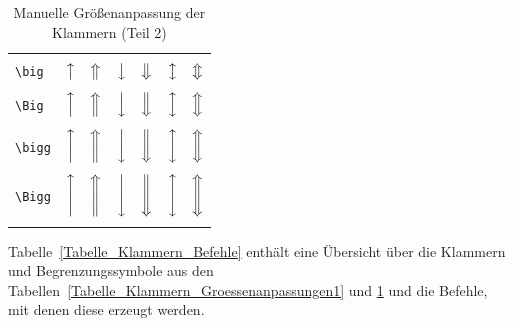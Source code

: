 \documentclass[a4paper,10pt,twoside]{scrbook}
\begin{document}
\begin{table}[h!tb]
\centering
\caption{Manuelle Größenanpassung der Klammern (Teil 2)}
\label{Tabelle_Klammern_Groessenanpassungen2}       %
\begin{tabular}{lcccccc}
\hline
& & & & & &   \\
\texttt{\textbackslash big} & $\big\uparrow$ & $\big\Uparrow$ &  
$\big\downarrow$ & $\big\Downarrow$ & $\big\updownarrow$ & $\big\Updownarrow$  \\
& & & & & &   \\
\texttt{\textbackslash Big} & $\Big\uparrow$ & $\Big\Uparrow$ &  
$\Big\downarrow$ & $\Big\Downarrow$ & $\Big\updownarrow$ & $\Big\Updownarrow$  \\
& & & & & &   \\
\texttt{\textbackslash bigg} & $\bigg\uparrow$ & $\bigg\Uparrow$ &  
$\bigg\downarrow$ & $\bigg\Downarrow$ & $\bigg\updownarrow$ & $\bigg\Updownarrow$ \\
& & & & & &   \\
\texttt{\textbackslash Bigg} & $\Bigg\uparrow$ & $\Bigg\Uparrow$ &  
$\Bigg\downarrow$ & $\Bigg\Downarrow$ & $\Bigg\updownarrow$ & $\Bigg\Updownarrow$ \\
& & & & & &   \\
\hline
\end{tabular}
\end{table}

Tabelle~\ref{Tabelle_Klammern_Befehle} enthält eine Übersicht über die 
Klammern und Begrenzungssymbole aus den Tabellen~\ref{Tabelle_Klammern_Groessenanpassungen1} und \ref{Tabelle_Klammern_Groessenanpassungen2} und die Befehle, mit denen diese erzeugt werden.
\end{document}
